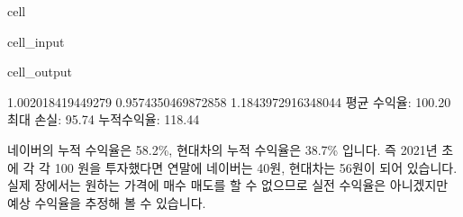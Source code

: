 \documentclass[letterpaper,10pt,english]{jupyterBook}
\begin{document}
\begin{sphinxuseclass}{cell}
\begin{sphinxVerbatimInput}
\begin{sphinxuseclass}{cell_input}
\begin{sphinxVerbatim}[commandchars=\\\{\}]
     \PYG{p}{[}\PYG{p}{[}\PYG{p}{]}\PYG{p}{]}\PYG{p}{[}\PYG{p}{]} \PYG{p}{[}\PYG{p}{[}\PYG{p}{]}\PYG{p}{]}\PYG{p}{[}\PYG{p}{]} \PYG{p}{[}\PYG{p}{[}\PYG{p}{]}\PYG{p}{]}\PYG{p}{[}\PYG{p}{]}

     
  

\end{sphinxVerbatim}

\end{sphinxuseclass}\end{sphinxVerbatimInput}
\begin{sphinxVerbatimOutput}

\begin{sphinxuseclass}{cell_output}
\begin{sphinxVerbatim}[commandchars=\\\{\}]
1.002018419449279 0.9574350469872858 1.1843972916348044
 평균 수익율: 100.20\PYGZpc{} 최대 손실: 95.74\PYGZpc{} 누적수익율: 118.44\PYGZpc{}
\end{sphinxVerbatim}

\end{sphinxuseclass}\end{sphinxVerbatimOutput}

\end{sphinxuseclass}
\sphinxAtStartPar
 네이버의 누적 수익율은 58.2\%, 현대차의 누적 수익율은 38.7\% 입니다. 즉 2021년 초에 각 각 100 원을 투자했다면 연말에 네이버는 40원, 현대차는 56원이 되어 있습니다. 실제 장에서는 원하는 가격에 매수 매도를 할 수 없으므로 실전 수익율은 아니겠지만 예상 수익율을 추정해 볼 수 있습니다.
\end{document}
